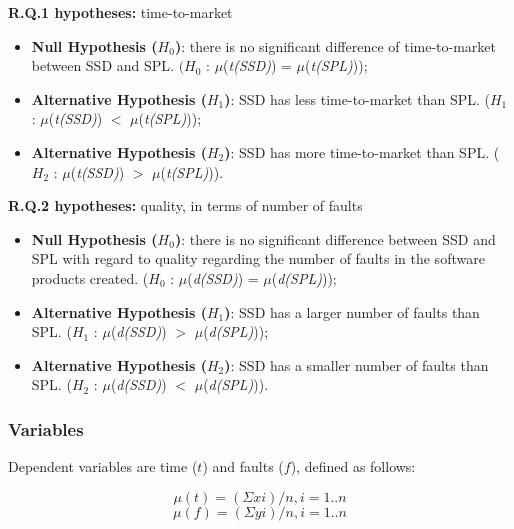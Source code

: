 \vspace{1em}
\textbf{R.Q.1 hypotheses:} time-to-market

	\begin{itemize}
    \setlength\itemsep{0.8em}
	\item \textbf{Null Hypothesis ($H_{0}$)}: there is no significant difference of time-to-market between SSD and SPL. $(H_{0}$ : $\mu$(\textit{t(SSD)}) =  $\mu$(\textit{t(SPL)}));
	
	\item \textbf{Alternative Hypothesis ($H_{1}$)}: SSD has less time-to-market than SPL. 	($H_{1}$ : $\mu$(\textit{t(SSD)}) $<$ $\mu$(\textit{t(SPL)}));
		
	\item \textbf{Alternative Hypothesis ($H_{2}$)}: SSD has more time-to-market than SPL. 	($H_{2}$ :  $\mu$(\textit{t(SSD)}) $>$ $\mu$(\textit{t(SPL)})).		
	\end{itemize}	

\vspace{1em}
\textbf{R.Q.2 hypotheses:}
quality, in terms of number of faults
	\begin{itemize}
    \setlength\itemsep{0.8em}
	
	\item \textbf{Null Hypothesis ($H_{0}$)}: there is no significant difference between SSD and SPL with regard to quality regarding the number of faults in the software products created. 	($H_{0}$ : $\mu$(\textit{d(SSD)}) =  $\mu$(\textit{d(SPL)}));
	
	\item \textbf{Alternative Hypothesis ($H_{1}$)}: SSD has a larger number of faults than SPL. ($H_{1}$ : $\mu$(\textit{d(SSD)}) $>$ $\mu$(\textit{d(SPL)}));
		
	\item \textbf{Alternative Hypothesis ($H_{2}$)}: SSD has a smaller number of faults than SPL. ($H_{2}$ :  $\mu$(\textit{d(SSD)}) $<$ $\mu$(\textit{d(SPL)})).		
	
	\end{itemize}

\subsubsection{Variables}

Dependent variables are time ($t$) and faults ($f$), defined as follows:

\small

\begin{equation}\label{eq:1}
\mu{(t)}=(\Sigma xi)/n, i = 1..n
\end{equation}
\begin{equation}\label{eq:2}
\mu{(f)}=(\Sigma yi)/n, i = 1..n
\end{equation}
\normalsize 

